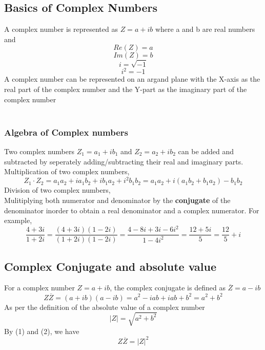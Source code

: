 \documentclass{article}
\begin{document}
\subsection*{Basics of Complex Numbers}
A complex number is represented as $Z = a + i b$ where a and b are real numbers and \begin{equation*} Re(Z)=a \end{equation*} \begin{equation*} Im(Z)=b \end{equation*}
\begin{equation*} i = \sqrt{-1} \end{equation*}
\begin{equation*} i^{2} = -1 \end{equation*}
A complex number can be represented on an argand plane with the X-axis as the real part of the complex number and the Y-part as the imaginary part of the complex number\\[2pt]
\
\subsubsection*{Algebra of Complex numbers}
Two complex numbers $Z_1 = a_1 + i b_1$ and $Z_2 = a_2 + i b_2$ can be added and subtracted by seperately adding/subtracting their real and imaginary parts. \\
Multiplication of two complex numbers,
\begin{equation*} Z_1 \cdot Z_2 = a_1 a_2 + i a_1 b_2 + i b_1 a_2 + i^{2} b_1 b_2 = a_1 a_2 + i (a_1 b_2 + b_1 a_2) - b_1 b_2  \end{equation*}
Division of two complex numbers, \\
Mulitiplying both numerator and denominator by the \textbf{conjugate} of the denominator inorder to obtain a real denominator and a complex numerator.
For example,
\begin{equation*} \frac{4+3i}{1+2i} = \frac{(4+3i)(1-2i)}{(1+2i)(1-2i)} = \frac{4-8i+3i-6i^2}{1-4i^2} = \frac{12+5i}{5} = \frac{12}{5} + i \end{equation*}
\subsection*{Complex Conjugate and absolute value}
For a complex number $Z = a + ib$, the complex conjugate is defined as $\overline{Z} = a - ib$ 
\begin{equation} Z\overline{Z} = (a+ib)(a-ib) = a^{2} - i ab + i ab + b^{2} = a^{2} + b^{2}\end{equation}
As per the definition of the absolute value of a complex number
\begin{equation} |Z| = \sqrt{a^2 + b^2} \end{equation} 
By (1) and (2), we have
\begin{equation*} Z\overline{Z} = |Z|^{2} \end{equation*}
\end{document}
